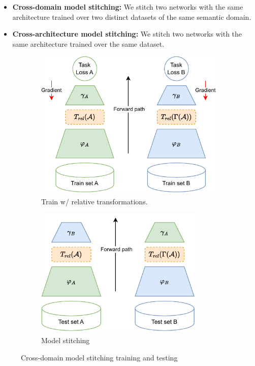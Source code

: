 \documentclass[../main.tex]{subfiles}
\begin{document}
\begin{itemize}
    \item \textbf{Cross-domain model stitching:} We stitch two networks with the same architecture trained over two distinct datasets of the same semantic domain.
    \item \textbf{Cross-architecture model stitching:} We stitch two networks with the same architecture trained over the same dataset.
\end{itemize}


\begin{figure}[ht!]
     \centering
    \begin{subfigure}[b]{0.45\textwidth}
         \centering
         \includegraphics[width=\textwidth]{figures/bg/relativeTrainScheme.pdf}
        \caption{Train w/ relative transformations.}
         \label{fig:relTrainScheme}
     \end{subfigure}\hfill
      \begin{subfigure}[b]{0.45\textwidth}
         \centering
         \includegraphics[width=0.9\textwidth]{figures/bg/relativeStitchScheme.pdf}
        \caption{Model stitching}
         \label{fig:relStitchScheme}
     \end{subfigure}
    \caption{Cross-domain model stitching training and testing}
    \label{fig:crossDomainScheme}
\end{figure}
\end{document}
